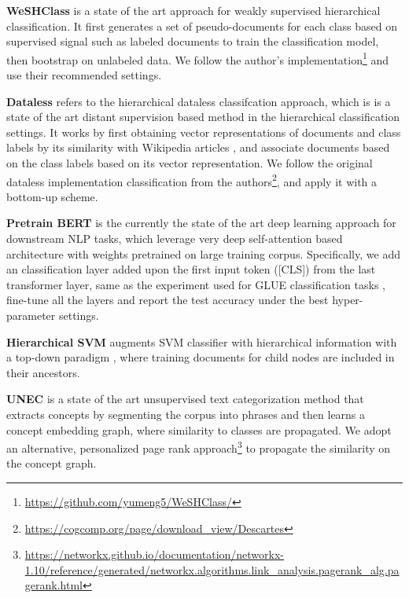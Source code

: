 \noindent \textbf{WeSHClass} \cite{meng2018weakly} is a state of the art approach for weakly supervised hierarchical classification. %
It first generates a set of pseudo-documents for each class based on supervised signal such as labeled documents to train the classification model, then bootstrap on unlabeled data. We follow the author's  implementation\footnote{\url{https://github.com/yumeng5/WeSHClass/}} and use their recommended settings.



\noindent \textbf{Dataless} refers to the hierarchical dataless classifcation approach, which is \cite{song2014dataless} is a state of the art distant supervision based method in the hierarchical classification settings.
It works by first obtaining vector representations of documents and class labels
by its similarity with Wikipedia articles \cite{egozi2011concept}, and 
associate documents based on the class labels based on its vector representation.  
We follow the original dataless implementation classification from the authors\footnote{\url{https://cogcomp.org/page/download_view/Descartes}}, and apply it with a bottom-up scheme.


\noindent \textbf{Pretrain BERT} is the currently the state of the art deep learning approach for downstream NLP tasks, which leverage very deep self-attention based architecture with weights pretrained on large training corpus. Specifically, we add an classification layer added upon the first input  token ([CLS]) from the last transformer layer, same as the experiment used for GLUE  classification tasks  \cite{devlin2018bert}, fine-tune all the layers and report the test accuracy under the best hyper-parameter settings.


\noindent \textbf{Hierarchical SVM} \cite{liu2005support} augments SVM classifier with hierarchical information with a top-down paradigm \cite{silla2011survey}, where training documents for child nodes are included in their ancestors.

\noindent \textbf{UNEC} \cite{li2018unsupervised} is a state of the art unsupervised text categorization method that extracts concepts by segmenting the corpus into phrases and then learns a concept embedding graph, where similarity to classes are propagated. We adopt an alternative, personalized page rank approach\footnote{\url{https://networkx.github.io/documentation/networkx-1.10/reference/generated/networkx.algorithms.link_analysis.pagerank_alg.pagerank.html}} to propagate the similarity on the concept graph.


